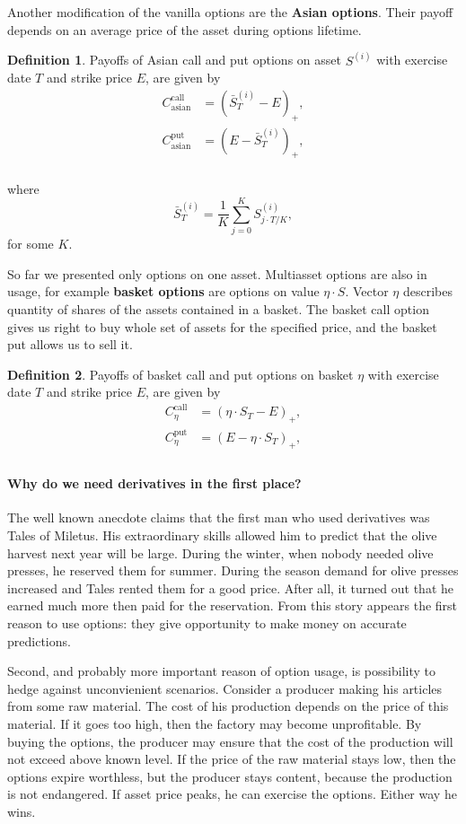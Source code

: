\documentclass[a4paper,11pt, twoside]{book}
\theoremstyle{definition}
\newtheorem{mydef}{Definition}[chapter]
\theoremstyle{remark}
\begin{document}
Another modification of the vanilla options are the \textbf{Asian options}. Their payoff depends on an average price of the asset during options lifetime.
\begin{mydef}
 Payoffs of Asian call and put options on asset $S^{(i)}$ with exercise date $T$ and strike price $E$, are given by
\begin{align*}
 C^{\text{call}}_{\text{asian}} &= (\bar{S}^{(i)}_T - E)_+, \\
 C^{\text{put}}_{\text{asian}} &= (E - \bar{S}^{(i)}_T)_+, \\
\end{align*}
\end{mydef}
\noindent where
\[ \bar{S}^{(i)}_T = \frac{1}{K} \sum\limits_{j=0}^K S^{(i)}_{j\cdot T/K}, \]
for some $K$. 

So far we presented only options on one asset. Multiasset options are also in usage, for example \textbf{basket options} are options on value $\eta \cdot S$. Vector $\eta$ describes quantity of shares of the assets contained in a basket. The basket call option gives us right to buy whole set of assets for the specified price, and the basket put allows us to sell it.
\begin{mydef}
 Payoffs of basket call and put options on basket $\eta$ with exercise date $T$ and strike price $E$, are given by
\begin{align*}
 C^{\text{call}}_{\eta} &= (\eta \cdot S_T - E)_+, \\
 C^{\text{put}}_{\eta} &= (E - \eta \cdot S_T)_+, \\
\end{align*}
\end{mydef}

\paragraph{Why do we need derivatives in the first place?}
The well known anecdote claims that the first man who used derivatives was Tales of Miletus. His extraordinary skills allowed him to predict that the olive harvest next year will be large. During the winter, when nobody needed olive presses, he reserved them for summer. During the season demand for olive presses increased and Tales rented them for a good price. After all, it turned out that he earned much more then paid for the reservation. From this story appears the first reason to use options: they give opportunity to make money on accurate predictions.

Second, and probably more important reason of option usage, is possibility to hedge against unconvienient scenarios. Consider a producer making his articles from some raw material. The cost of his production depends on the price of this material. If it goes too high, then the factory may become unprofitable. By buying the options, the producer may ensure that the cost of the production will not exceed above known level. If the price of the raw material stays low, then the options expire worthless, but the producer stays content, because the production is not endangered. If asset price peaks, he can exercise the options. Either way he wins.
\end{document}
